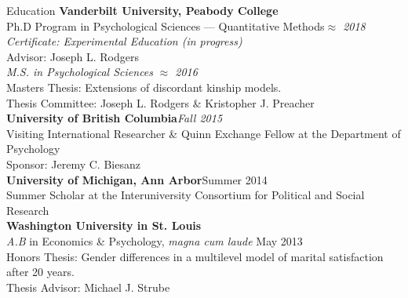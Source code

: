 \documentclass {resume}
\begin{document}
\nonfrenchspacing
\thispagestyle{myheadings}
\markright{\em{\textrm \today}}

\begin{rSection}{\textrm{Education}}
{\bf Vanderbilt University, Peabody College} \\
Ph.D Program in Psychological Sciences --- Quantitative Methods\hfill  {\em $\approx$ 2018} \\
\hspace* {3 mm}\textit{Certificate: Experimental Education (in progress)}\\
\hspace* {3 mm}Advisor: Joseph L. Rodgers%
\smallskip\\
\textit{M.S. in Psychological Sciences} \hfill  {\em $\approx$ 2016} \\
\hspace* {3 mm}Masters Thesis: Extensions of discordant kinship models.\\
\hspace* {3 mm}Thesis Committee: Joseph L. Rodgers \& Kristopher J. Preacher%
\medskip\\
\textbf{University of British Columbia}\hfill \textit{Fall 2015}\\ 
Visiting International Researcher \& Quinn Exchange Fellow at the Department of Psychology\\
\hspace* {3 mm} Sponsor: Jeremy C. Biesanz\medskip\\
\textbf{University of Michigan, Ann Arbor}\hfill Summer 2014\\ 
Summer Scholar at the Interuniversity Consortium for Political and Social Research\medskip\\
{\bf Washington University in St. Louis}\\
{\em A.B} in Economics \& Psychology, \textit{magna cum laude} \hfill  {May 2013} \\
\hspace* {3 mm}Honors Thesis: Gender differences in a multilevel model of marital satisfaction after 20 years.\\
\hspace* {3 mm}Thesis Advisor: Michael J. Strube%
\end{rSection}
\end{document}
